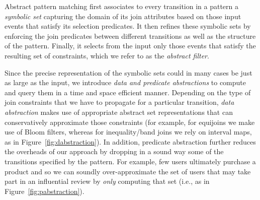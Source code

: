 Abstract pattern matching first associates to every transition in a pattern a
{\em symbolic set} capturing the domain of its join attributes based on those
input events that satisfy its selection predicates.  It then refines these
symbolic sets by enforcing the join predicates
between different transitions as well as the structure of the pattern.
Finally, it selects from the input only those events that satisfy the resulting
set of constraints, which we refer to as the {\em abstract filter}.

Since the precise representation of the symbolic sets could in many cases be
just as large as the input, we introduce {\em data and predicate abstractions}
to compute and query them in a time and space efficient manner.  Depending on
the type of join constraints that we have to propagate for a particular
transition, {\em data abstraction} makes use of appropriate abstract set
representations that can conservatively approximate those constraints (for
example, for equijoins we make use of Bloom filters\cite{Bloom:1970}, whereas
for inequality/band joins we rely on interval maps, as in
Figure~\ref{fig:dabstraction}).  In addition, predicate abstraction further
reduces the overheads of our approach by dropping in a sound way some of the
transitions specified by the pattern.  For example, few users ultimately purchase
a product and so we can soundly over-approximate the set of users that may take
part in an influential review by \emph{only} computing that set (i.e., as in
Figure~\ref{fig:pabstraction}).

